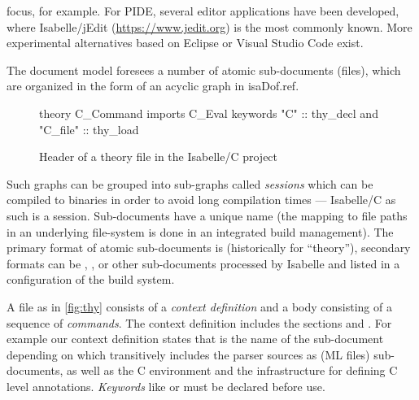 \begin{isabellebody}
\begin{isamarkuptext}
focus, for example. For PIDE, several editor applications have been developed, where Isabelle/jEdit
(\url{https://www.jedit.org}) is the most commonly known. More
experimental alternatives based on Eclipse or Visual Studio Code exist.%
\end{isamarkuptext}\isamarkuptrue%
%
\isadelimdocument
%
\endisadelimdocument
%
\isatagdocument
%
\isamarkuptrue%
%
\endisatagdocument
{\isafolddocument}%
%
\isadelimdocument
%
\endisadelimdocument
%
\begin{isamarkuptext}%
The document model foresees a number of atomic sub-documents (files), which are organized in the
form of an acyclic graph in \csname isaDof.ref.
\begin{figure}
  \centering
\begin{minipage}{0.33\textwidth}
\begin{isar}
theory C_Command
  imports C_Eval
  keywords "C" :: thy_decl
       and "C_file" :: thy_load
\end{isar}
\end{minipage}
  \caption{Header of a theory file in the Isabelle/C project}
  \label{fig:thy}
\end{figure}
Such graphs can be grouped into sub-graphs called \emph{sessions} which can be compiled to binaries in 
order to avoid long compilation times --- Isabelle/C as such is a session. Sub-documents have a 
unique  name (the mapping to file paths in an underlying file-system is done in an integrated build 
management). The primary format of atomic sub-documents is  (historically for
``theory''), secondary formats can be , ,  or other sub-documents processed 
by Isabelle and listed in a configuration of the build system. 

A  file as in \autoref{fig:thy} consists of a \emph{context
definition} and a body consisting of a sequence of \emph{commands}. The
context definition includes the sections  and
.  For example our context definition states that
 is the name of the sub-document depending on
 which transitively includes the parser sources as (ML files)
sub-documents, as well as the C environment and the infrastructure for defining C level
annotations. \emph{Keywords} like  or
 must be declared before use.


\end{isamarkuptext}
\end{isabellebody}
